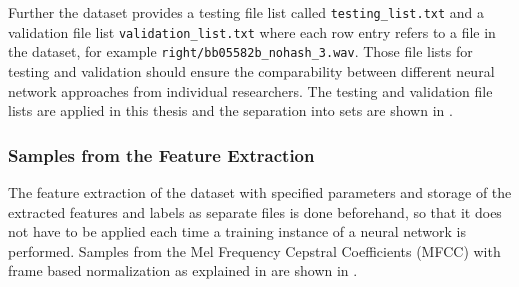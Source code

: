 Further the dataset provides a testing file list called \texttt{testing\_list.txt} and a validation file list \texttt{validation\_list.txt} where each row entry refers to a file in the dataset, for example \texttt{right/bb05582b\_nohash\_3.wav}.
Those file lists for testing and validation should ensure the comparability between different neural network approaches from individual researchers.
The testing and validation file lists are applied in this thesis and the separation into sets are shown in .


\subsubsection{Samples from the Feature Extraction}
The feature extraction of the dataset with specified parameters and storage of the extracted features and labels as separate files is done beforehand, so that it does not have to be applied each time a training instance of a neural network is performed.
Samples from the Mel Frequency Cepstral Coefficients (MFCC) with frame based normalization as explained in  are shown in .
